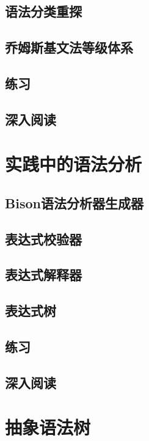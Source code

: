 \documentclass[cn,11pt,chinese]{elegantbook}
\begin{document}
\section{语法分类重探}

\section{乔姆斯基文法等级体系}

\section{练习}

\section{深入阅读}

\chapter{实践中的语法分析}

\section{Bison语法分析器生成器}

\section{表达式校验器}

\section{表达式解释器}

\section{表达式树}

\section{练习}

\section{深入阅读}

\chapter{抽象语法树}
\end{document}
